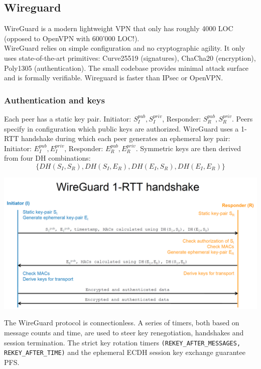 \subsection{Wireguard}

WireGuard is a modern lightweight VPN that only has roughly 4000 LOC (opposed to OpenVPN with 600'000 LOC!).\\
WireGuard relies on simple configuration and no cryptographic agility. It only uses state-of-the-art primitives: Curve25519 (signatures), ChaCha20 (encryption), Poly1305 (authentication). The small codebase provides minimal attack surface and is formally verifiable. Wireguard is faster than IPsec or OpenVPN. 

\subsubsection{Authentication and keys}

Each peer has a static key pair. Initiator: $S_I^{pub}, S_I^{priv}$, Responder: $S_R^{pub}, S_R^{priv}$. Peers specify in configuration which public keys are authorized. WireGuard uses a 1-RTT handshake during which each peer generates an ephemeral key pair: Initiator: $E_I^{pub}, E_I^{priv}$, Responder: $E_R^{pub}, E_R^{priv}$. Symmetric keys are then derived from four DH combinations: $$\{DH(S_I,S_R), DH(S_I,E_R), DH(E_I,S_R), DH(E_I,E_R)\}$$

\begin{minipage}{\linewidth}
    \centering      
    \includegraphics[width=\linewidth]{Figures/VPN_wireguard.PNG} 
\end{minipage}

The WireGuard protocol is connectionless. A series of timers, both based on message counts and time, are used to steer key renegotiation, handshakes and session termination. The strict key rotation timers \texttt{(REKEY\_AFTER\_MESSAGES, REKEY\_AFTER\_TIME)} and the ephemeral
ECDH session key exchange guarantee PFS.

